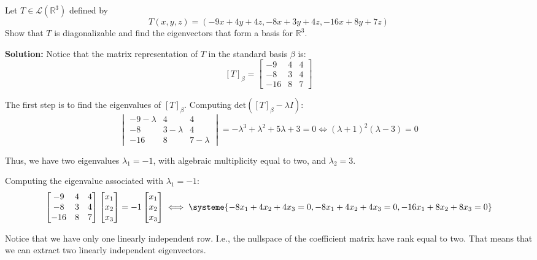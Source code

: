 \begin{example}

	Let $T \in \mathcal{L}(\mathbb{R}^3)$ defined by \[T(x,y,z) = (-9x+4y+4z, -8x+3y+4z, -16x+8y+7z)\] Show that $T$ is diagonalizable and find the eigenvectors that form a basis for $\mathbb{R}^3$.

	\textbf{Solution:} Notice that the matrix representation of $T$ in the standard basis $\beta$ is:
	\[
		[T]_{\beta} = 
		\begin{bmatrix}
		-9 & 4 & 4 \\
		-8 & 3 & 4 \\
		-16 & 8 & 7
		\end{bmatrix}
	\]

	The first step is to find the eigenvalues of $[T]_{\beta}$. Computing $\text{det}([T]_{\beta} - \lambda I)$:
	\[
		\begin{vmatrix}
		-9-\lambda & 4 & 4 \\
		-8 & 3-\lambda & 4 \\
		-16 & 8 & 7-\lambda
		\end{vmatrix}
		= -\lambda^3+\lambda^2+5\lambda+3 = 0 \iff (\lambda+1)^2(\lambda-3) = 0
	\]

	Thus, we have two eigenvalues $\lambda_1 = -1$, with algebraic multiplicity equal to two, and $\lambda_2 = 3$. 

	Computing the eigenvalue associated with $\lambda_1 = -1$:
	\[
		\begin{bmatrix}
		-9 & 4 & 4 \\
		-8 & 3 & 4 \\
		-16 & 8 & 7
		\end{bmatrix}
		\begin{bmatrix}
		x_1 \\
		x_2 \\
		x_3 \\
		\end{bmatrix}
		= -1 \begin{bmatrix}
		x_1 \\
		x_2 \\
		x_3 \\
		\end{bmatrix}
		\iff
		\systeme{-8x_1 + 4 x_2 + 4x_3 = 0, -8x_1+4x_2+4x_3 = 0, -16x_1+8x_2+8x_3 = 0}
	\]

	Notice that we have only one linearly independent row. I.e., the nullspace of the coefficient matrix have rank equal to two. That means that we can extract two linearly independent eigenvectors.


\end{example}
